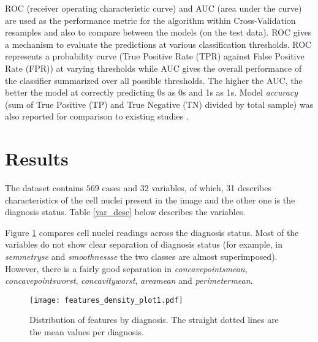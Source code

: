 \noindent ROC (receiver operating characteristic curve) and AUC (area under the curve) are used as the performance metric for the algorithm within Cross-Validation resamples and also to compare between the models (on the test data). ROC gives a mechanism to evaluate the predictions at various classification thresholds. ROC represents a probability curve (True Positive Rate (TPR) against False Positive Rate (FPR)) at varying thresholds while AUC gives the overall performance of the classifier summarized over all possible thresholds. The higher the AUC, the better the model at correctly predicting 0s as 0s and 1s as 1s. Model \textit{accuracy} (sum of True Positive (TP) and True Negative (TN) divided by total sample) was also reported for comparison to existing studies \citep{james2013introduction}.

\clearpage

\section{Results}

The dataset contains $569$ cases and $32$ variables, of which, 31 describes characteristics of the cell nuclei present in the image and the other one is the diagnosis status. Table \ref{var_desc} below describes the variables.
\vspace*{-10pt}
\begin{table}[H]
\centering
\caption{\small{Variables description and summary}}\vspace{-0.3cm}
\end{table}
\vspace*{-12pt}

\noindent Figure \ref{fig:features} compares cell nuclei readings across the diagnosis status.  Most of the variables do not show clear separation of diagnosis status (for example, in \textit{semmetryse} and \textit{smoothnessse} the two classes are almost superimposed). However, there is a fairly good separation in \textit{concavepointsmean}, \textit{concavepointsworst}, \textit{concavityworst}, \textit{areamean} and \textit{perimetermean}.

\noindent\begin{figure}[H]
    \centering
    \texttt{[image: features\_density\_plot1.pdf]}\vspace{-0.3cm}
    \caption{\small{Distribution of features by diagnosis. The straight dotted lines are the mean values per diagnosis.}}\label{fig:features}
\end{figure}

